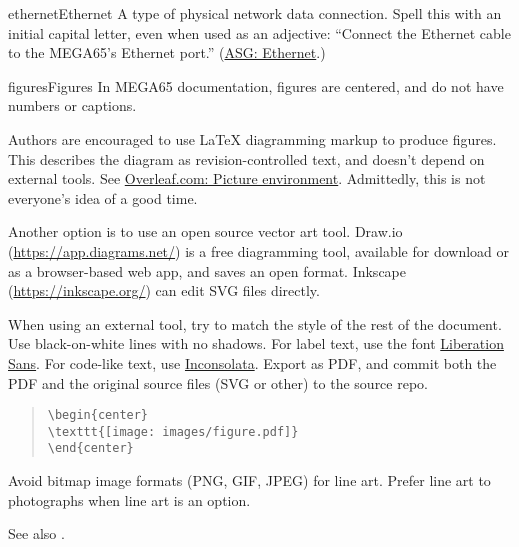 \begin{sgentry}{ethernet}{Ethernet}
    A type of physical network data connection. Spell this with an initial capital letter, even when used as an adjective: ``Connect the Ethernet cable to the MEGA65's Ethernet port.'' (\href{https://support.apple.com/en-my/guide/applestyleguide/apsg076a7313/web}{ASG: Ethernet}.)
\end{sgentry}

\begin{sgentry}{figures}{Figures}
    In MEGA65 documentation, figures are centered, and do not have numbers or captions.

    Authors are encouraged to use LaTeX diagramming markup to produce figures. This describes the diagram as revision-controlled text, and doesn't depend on external tools. See \href{https://www.overleaf.com/learn/latex/Picture_environment}{Overleaf.com: Picture environment}. Admittedly, this is not everyone's idea of a good time.

    Another option is to use an open source vector art tool. Draw.io (\url{https://app.diagrams.net/}) is a free diagramming tool, available for download or as a browser-based web app, and saves an open format. Inkscape (\url{https://inkscape.org/}) can edit SVG files directly.

    When using an external tool, try to match the style of the rest of the document. Use black-on-white lines with no shadows. For label text, use the font \href{https://en.wikipedia.org/wiki/Liberation_fonts}{Liberation Sans}. For code-like text, use \href{https://fonts.google.com/specimen/Inconsolata}{Inconsolata}. Export as PDF, and commit both the PDF and the original source files (SVG or other) to the source repo.

    \begin{quote}
\begin{verbatim}
\begin{center}
\texttt{[image: images/figure.pdf]}
\end{center}
\end{verbatim}
    \end{quote}

    Avoid bitmap image formats (PNG, GIF, JPEG) for line art. Prefer line art to photographs when line art is an option.

    See also .
\end{sgentry}

